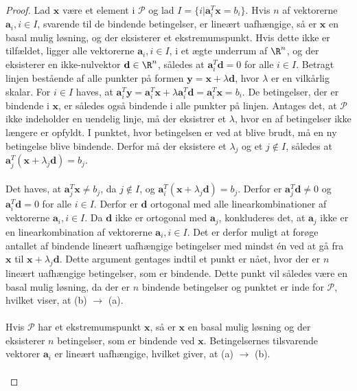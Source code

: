 \begin{proof}
Lad $\textbf{x}$ være et element i $\mathcal{P}$ og lad $I = \{ i| \textbf{a}_i^T\textbf{x} = b_i \}$.
Hvis $n$ af vektorerne  $\textbf{a}_i, i \in I$, svarende til de bindende betingelser, er lineært uafhængige, så er $\textbf{x}$ en basal mulig løsning, og der eksisterer et ekstremumspunkt.
Hvis dette ikke er tilfældet, ligger alle vektorerne $\textbf{a}_i, i \in I$, i et ægte underrum af $\R^n$, og der eksisterer en ikke-nulvektor $\textbf{d} \in \R^n$, således at $\textbf{a}_i^T\textbf{d} = 0$ for alle $i \in I$.
Betragt linjen bestående af alle punkter på formen $\textbf{y} = \textbf{x} + \lambda \textbf{d}$, hvor $\lambda$ er en vilkårlig skalar.
For $i \in I$ haves, at $\textbf{a}_i^T\textbf{y} = \textbf{a}_i^T\textbf{x} + \lambda \textbf{a}_i^T\textbf{d} = \textbf{a}_i^T\textbf{x} = b_i$.
De betingelser, der er bindende i $\textbf{x}$, er således også bindende i alle punkter på linjen.
Antages det, at $\mathcal{P}$ ikke indeholder en uendelig linje, må der eksistrer et $\lambda$, hvor en af betingelser ikke længere er opfyldt.
I punktet, hvor betingelsen er ved at blive brudt, må en ny betingelse blive bindende.
Derfor må der eksistere et $\lambda_j$ og et $j \notin I$, således at $\textbf{a}_j^T (\textbf{x} + \lambda_j\textbf{d}) = b_j$.\\\\
%
Det haves, at $\textbf{a}_j^T\textbf{x} \neq b_j$, da $j \notin I$, og $\textbf{a}_i^T (\textbf{x} + \lambda_j\textbf{d}) = b_j$.
Derfor er $\textbf{a}_j^T\textbf{d} \neq 0$ og $\textbf{a}_i^T\textbf{d} = 0$ for alle $i \in I$.
Derfor er $\textbf{d}$ ortogonal med alle linearkombinationer af vektorerne $\textbf{a}_i, i\in I$.
Da $\textbf{d}$ ikke er ortogonal med $\textbf{a}_j$, konkluderes det, at $\textbf{a}_j$ ikke er en linearkombination af vektorerne $\textbf{a}_i, i \in I$.
Det er derfor muligt at forøge antallet af bindende lineært uafhængige betingelser med mindst én ved at gå fra $\textbf{x}$ til $\textbf{x} + \lambda_j\textbf{d}$.
Dette argument gentages indtil et punkt er nået, hvor der er $n$ lineært uafhængige betingelser, som er bindende.
Dette punkt vil således være en basal mulig løsning, da der er $n$ bindende betingelser og punktet er inde for $\mathcal{P}$, hvilket viser, at (b) $\rightarrow$ (a).\\\\
%
Hvis $\mathcal{P}$ har et ekstremumspunkt $\textbf{x}$, så er $\textbf{x}$ en basal mulig løsning og der eksisterer $n$ betingelser, som er bindende ved $\textbf{x}$.
Betingelsernes tilsvarende vektorer $\textbf{a}_i$ er lineært uafhængige, hvilket giver, at (a) $\rightarrow$ (b).\\\\

\end{proof}
